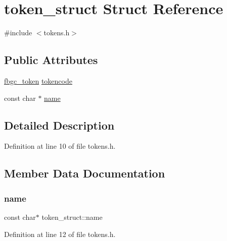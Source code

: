 \hypertarget{structtoken__struct}{}\section{token\+\_\+struct Struct Reference}
\label{structtoken__struct}


{\ttfamily \#include $<$tokens.\+h$>$}

\subsection*{Public Attributes}
\begin{DoxyCompactItemize}
\item 
\hyperlink{tokens_8h_a9d21ebbf42e602eb0cf502c867d20a7e}{fbgc\+\_\+token} \hyperlink{structtoken__struct_a46bcc1c446d312808d7c9b2d7af60278}{tokencode}
\item 
const char $\ast$ \hyperlink{structtoken__struct_a4b448bf865f05525d6fa1a02b1953976}{name}
\end{DoxyCompactItemize}


\subsection{Detailed Description}


Definition at line 10 of file tokens.\+h.



\subsection{Member Data Documentation}
\mbox{\label{structtoken__struct_a4b448bf865f05525d6fa1a02b1953976}} 
\subsubsection{\texorpdfstring{name}{name}}
{\footnotesize\ttfamily const char$\ast$ token\+\_\+struct\+::name}



Definition at line 12 of file tokens.\+h.

\mbox{\label{structtoken__struct_a46bcc1c446d312808d7c9b2d7af60278}} 
